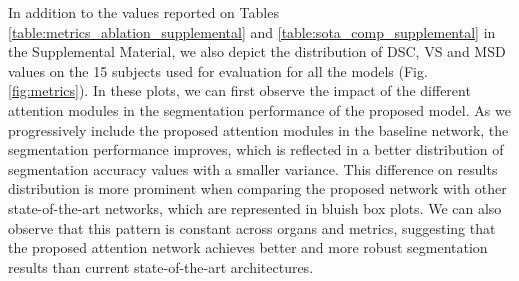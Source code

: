 \documentclass[journal]{IEEEtran}
\begin{document}
In addition to the values reported on Tables \ref{table:metrics_ablation_supplemental} and \ref{table:sota_comp_supplemental} in the Supplemental Material, we also depict the distribution of DSC, VS and MSD values on the 15 subjects used for evaluation for all the models (Fig. \ref{fig:metrics}). In these plots, we can first observe the impact of the different attention modules in the segmentation performance of the proposed model. As we progressively include the proposed attention modules in the baseline network, the segmentation performance improves, which is reflected in a better distribution of segmentation accuracy values with a smaller variance. This difference on results distribution is more prominent when comparing the proposed network with other state-of-the-art networks, which are represented in bluish box plots. We can also observe that this pattern is constant across organs and metrics, suggesting that the proposed attention network achieves better and more robust segmentation results than current state-of-the-art architectures.
\end{document}
